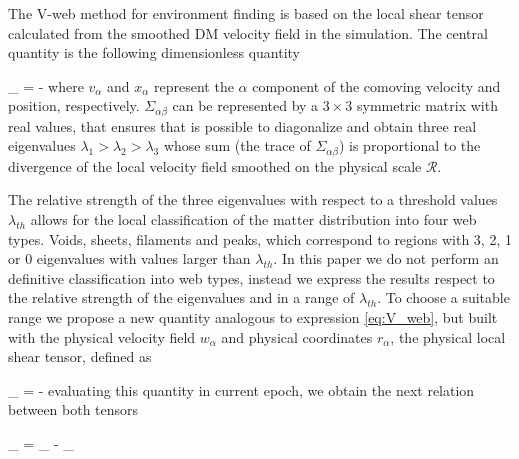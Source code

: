 \documentclass[usenatbib]{latex/mn2e}
\begin{document}
The V-web method for environment finding is based on the local shear 
tensor calculated from the smoothed DM velocity field in the simulation.
The central quantity is the following dimensionless quantity 


{
\Sigma_{\alpha\beta} = -
}
where $v_{\alpha}$ and $x_{\alpha}$ represent the $\alpha$ component of 
the comoving velocity and position, respectively. $\Sigma_{\alpha\beta}$ 
can be represented by a $3\times 3$ symmetric matrix with real values,
that ensures that is possible to diagonalize and obtain three real 
eigenvalues $\lambda_{1} > \lambda_{2}>\lambda_3$ whose sum (the trace of
$\Sigma_{\alpha\beta}$) is proportional to the divergence of the local 
velocity field smoothed on the physical scale ${\mathcal R}$. 


The relative strength of the three eigenvalues with respect to a threshold
values $\lambda_{th}$ allows for the local classification of the matter 
distribution into four web types. Voids, sheets, filaments and peaks, 
which correspond to regions with 3, 2, 1 or 0 eigenvalues with values 
larger than $\lambda_{th}$. In this paper we do not perform an definitive 
classification into web types, instead we express the results respect to 
the relative strength of the eigenvalues and in a range of $\lambda_{th}$.
To choose a suitable range we propose a new quantity analogous to 
expression \ref{eq:V_web}, but built with the physical velocity field 
$w_{\alpha}$ and physical coordinates $r_{\alpha}$, the physical local 
shear tensor, defined as 


{
\Pi_{\alpha\beta} = -
}
evaluating this quantity in current epoch, we obtain the next relation 
between both tensors


{ \Pi_{\alpha\beta} = \Sigma_{\alpha\beta} - \delta_{\alpha\beta} }
\end{document}
